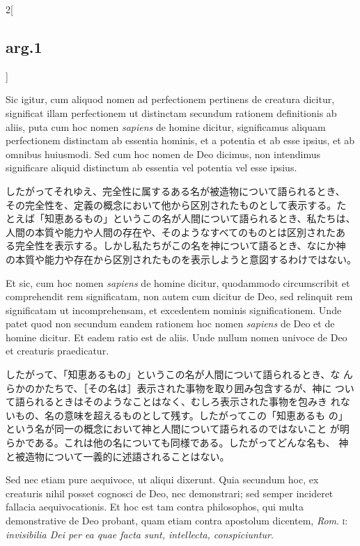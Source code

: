 \documentclass[paper=a4paper,fontsize=10pt,jafontsize=9pt,titlepage]{jlreq}
\begin{document}
\begin{paracol}{2}[\subsection{arg.1}]
\switchcolumn*

Sic igitur, cum aliquod nomen ad perfectionem pertinens de creatura
dicitur, significat illam perfectionem ut distinctam secundum rationem
definitionis ab aliis, puta cum hoc nomen {\itshape sapiens} de homine
dicitur, significamus aliquam perfectionem distinctam ab essentia
hominis, et a potentia et ab esse ipsius, et ab omnibus huiusmodi. Sed
cum hoc nomen de Deo dicimus, non intendimus significare aliquid
distinctum ab essentia vel potentia vel esse ipsius.

\switchcolumn

したがってそれゆえ、完全性に属するある名が被造物について語られるとき、
その完全性を、定義の概念において他から区別されたものとして表示する。た
とえば「知恵あるもの」というこの名が人間について語られるとき、私たちは、
人間の本質や能力や人間の存在や、そのようなすべてのものとは区別されたあ
る完全性を表示する。しかし私たちがこの名を神について語るとき、なにか神
の本質や能力や存在から区別されたものを表示しようと意図するわけではない。

\switchcolumn*

Et sic, cum hoc nomen {\itshape sapiens} de homine dicitur, quodammodo
circumscribit et comprehendit rem significatam, non autem cum dicitur
de Deo, sed relinquit rem significatam ut incomprehensam, et
excedentem nominis significationem. Unde patet quod non secundum
eandem rationem hoc nomen {\itshape sapiens} de Deo et de homine
dicitur. Et eadem ratio est de aliis. Unde nullum nomen univoce de Deo
et creaturis praedicatur.

\switchcolumn

したがって、「知恵あるもの」というこの名が人間について語られるとき、な
んらかのかたちで、［その名は］表示された事物を取り囲み包含するが、神に
ついて語られるときはそのようなことはなく、むしろ表示された事物を包みき
れないもの、名の意味を超えるものとして残す。したがってこの「知恵あるも
の」という名が同一の概念において神と人間について語られるのではないこと
が明らかである。これは他の名についても同様である。したがってどんな名も、
神と被造物について一義的に述語されることはない。

\switchcolumn*

Sed nec etiam pure aequivoce, ut aliqui dixerunt. Quia secundum hoc,
ex creaturis nihil posset cognosci de Deo, nec demonstrari; sed semper
incideret fallacia aequivocationis. Et hoc est tam contra philosophos,
qui multa demonstrative de Deo probant, quam etiam contra apostolum
dicentem, {\itshape Rom}. {\scshape i}: {\itshape invisibilia Dei per ea quae facta
sunt, intellecta, conspiciuntur}.


\end{paracol}
\end{document}
